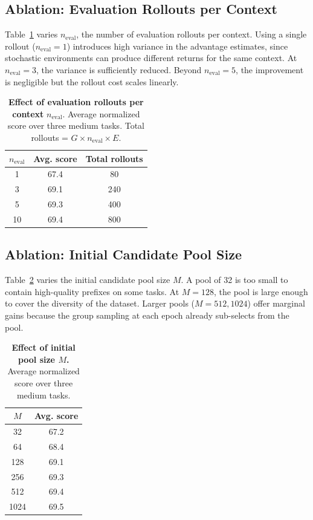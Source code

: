 \documentclass{article}
\begin{document}
\subsection{Ablation: Evaluation Rollouts per Context}
\label{app:neval}

Table~\ref{tab:neval} varies $n_{\text{eval}}$, the number of evaluation rollouts per context. Using a single rollout ($n_{\text{eval}} = 1$) introduces high variance in the advantage estimates, since stochastic environments can produce different returns for the same context. At $n_{\text{eval}} = 3$, the variance is sufficiently reduced. Beyond $n_{\text{eval}} = 5$, the improvement is negligible but the rollout cost scales linearly.

\begin{table}[h]
\centering
\caption{\textbf{Effect of evaluation rollouts per context} $n_{\text{eval}}$. Average normalized score over three medium tasks. Total rollouts = $G \times n_{\text{eval}} \times E$.}
\label{tab:neval}
\vspace{0.5em}
\begin{tabular}{c c c}
\toprule
$n_{\text{eval}}$ & \textbf{Avg. score} & \textbf{Total rollouts} \\
\midrule
1 & 67.4 & 80 \\
3 & 69.1 & 240 \\
5 & 69.3 & 400 \\
10 & 69.4 & 800 \\
\bottomrule
\end{tabular}
\end{table}

\subsection{Ablation: Initial Candidate Pool Size}
\label{app:pool_size}

Table~\ref{tab:pool_size} varies the initial candidate pool size $M$. A pool of 32 is too small to contain high-quality prefixes on some tasks. At $M = 128$, the pool is large enough to cover the diversity of the dataset. Larger pools ($M = 512, 1024$) offer marginal gains because the group sampling at each epoch already sub-selects from the pool.

\begin{table}[h]
\centering
\caption{\textbf{Effect of initial pool size $M$.} Average normalized score over three medium tasks.}
\label{tab:pool_size}
\vspace{0.5em}
\begin{tabular}{c c}
\toprule
$M$ & \textbf{Avg. score} \\
\midrule
32 & 67.2 \\
64 & 68.4 \\
128 & 69.1 \\
256 & 69.3 \\
512 & 69.4 \\
1024 & 69.5 \\
\bottomrule
\end{tabular}
\end{table}
\end{document}
